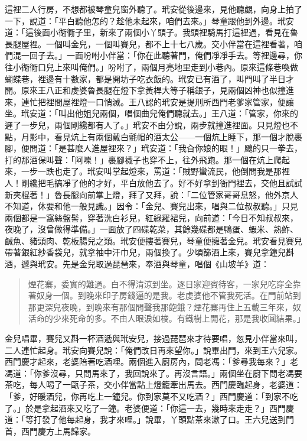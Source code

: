 這裡二人行房，不想都被琴童兒窗外聽了。玳安從後邊來，見他聽覷，向身上拍了一下，說道：「平白聽他怎的？趁他未起來，咱們去來。」琴童跟他到外邊。玳安道：「這後面小衚衕子里，新來了兩個小丫頭子。我頭裡騎馬打這裡過，看見在魯長腿屋裡。一個叫金兒，一個叫賽兒，都不上十七八歲。交小伴當在這裡看著，咱們混一回子去。」一面吩咐小伴當：「你在此聽著門，俺們凈凈手去。等裡邊尋，你往小衚衕口兒上來叫俺們。」吩咐了，兩個月亮地里走到小巷內。原來這條巷喚做蝴蝶巷，裡邊有十數家，都是開坊子吃衣飯的。玳安已有酒了，叫門叫了半日才開。原來王八正和虔婆魯長腿在燈下拿黃桿大等子稱銀子，見兩個凶神也似撞進來，連忙把裡間屋裡燈一口悄滅。王八認的玳安是提刑所西門老爹家管家，便讓坐。玳安道：「叫出他姐兒兩個，唱個曲兒俺們聽就去。」王八道：「管家，你來的遲了一步兒，兩個剛纔都有人了。」玳安不由分說，兩步就撞進裡面。只見燈也不點，月影中，看見炕上有兩個戴白氈帽的酒太公——一個炕上睡下，那一個才脫裹腳，便問道：「是甚麼人進屋裡來？」玳安道：「我㒲你娘的眼！」颼的只一拳去，打的那酒保叫聲：「阿嚛！」裹腳襪子也穿不上，往外飛跑。那一個在炕上爬起來，一步一跌也走了。玳安叫掌起燈來，罵道：「賊野蠻流民，他倒問我是那裡人！剛纔把毛搞凈了他的才好，平白放他去了。好不好拿到衙門裡去，交他且試試新夾棍著！」魯長腿向前掌上燈，拜了又拜，說：「二位管家哥哥息怒，他外京人不知道，休要和他一般見識。」因令：「金兒、賽兒出來，唱與二位叔叔聽。」只見兩個都是一窩絲盤髻，穿著洗白衫兒，紅綠羅裙兒，向前道：「今日不知叔叔來，夜晚了，沒曾做得準備。」一面放了四碟乾菜，其餘幾碟都是鴨蛋、蝦米、熟鮓、鹹魚、豬頭肉、乾板腸兒之類。玳安便摟著賽兒，琴童便擁著金兒。玳安看見賽兒帶著銀紅紗香袋兒，就拿袖中汗巾兒，兩個換了。少頃篩酒上來，賽兒拿鐘兒斟酒，遞與玳安。先是金兒取過琵琶來，奉酒與琴童，唱個《山坡羊》道：
\begin{quote}
煙花寨，委實的難過。白不得清涼到坐。逐日家迎賓待客，一家兒吃穿全靠著奴身一個。到晚來印子房錢逼的是我。老虔婆他不管我死活。在門前站到那更深兒夜晚，到晚來有那個問聲我那飽餓？煙花寨再住上五載三年來，奴活命的少來死命的多。不由人眼淚如梭。有鐵樹上開花，那是我收圓結果。」
\end{quote}

金兒唱畢，賽兒又斟一杯酒遞與玳安兒，接過琵琶來才待要唱，忽見小伴當來叫，二人連忙起身。玳安向賽兒說：「俺們改日再來望你。」說畢出門，來到王六兒家。西門慶才起來，老婆陪著吃酒哩。兩個進入廚房內，問老馮：「爹尋我每來？」老馮道：「你爹沒尋，只問馬來了，我回說來了。再沒言語。」兩個坐在廚下問老馮要茶吃，每人喝了一甌子茶，交小伴當點上燈籠牽出馬去。西門慶臨起身，老婆道：「爹，好暖酒兒，你再吃上一鐘兒。你到家莫不又吃酒？」西門慶道：「到家不吃了。」於是拿起酒來又吃了一鐘。老婆便道：「你這一去，幾時來走走？」西門慶道：「等打發了他每起身，我才來哩。」說畢，丫頭點茶來漱了口。王六兒送到門首，西門慶方上馬歸家。

